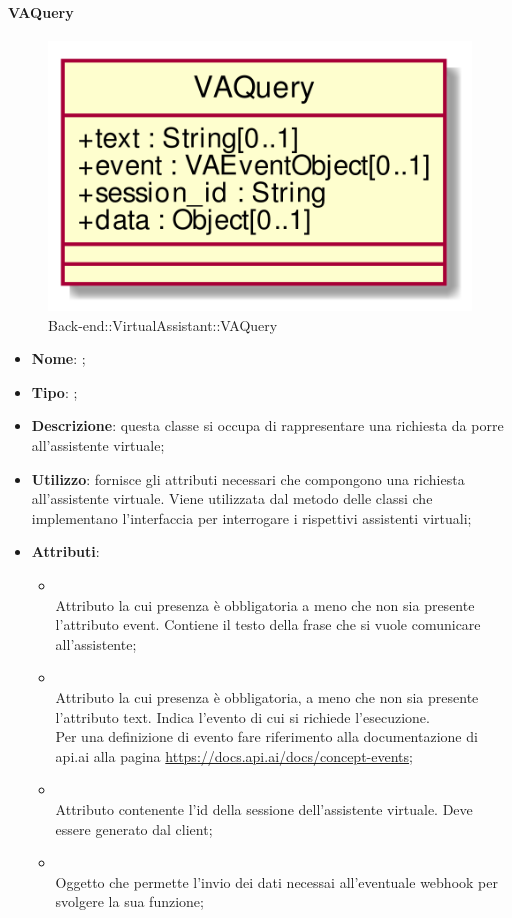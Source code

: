\hypertarget{VAQuery_label}{\paragraph{VAQuery}}
\begin{figure}[h]
	\centering
	\includegraphics[width=\textwidth,height=\textheight,keepaspectratio]{images/ClassVAQuery.png}
	\caption{Back-end::VirtualAssistant::VAQuery}
\end{figure}
\begin{itemize}
	\item \textbf{Nome}: ;
	\item \textbf{Tipo}: ;
	\item \textbf{Descrizione}: questa classe si occupa di rappresentare una richiesta da porre all'assistente virtuale;
	\item \textbf{Utilizzo}: fornisce gli attributi necessari che compongono una richiesta all'assistente virtuale. Viene utilizzata dal metodo  delle classi che implementano l'interfaccia  per interrogare i rispettivi assistenti virtuali;
	\item \textbf{Attributi}:
	\begin{itemize}
		\item[]  \\
		Attributo la cui presenza è obbligatoria a meno che non sia presente l'attributo event. Contiene il testo della frase che si vuole comunicare all'assistente;
		\item[]  \\
		Attributo la cui presenza è obbligatoria, a meno che non sia presente l'attributo text. Indica l'evento di cui si richiede l'esecuzione. \\ Per una definizione di evento fare riferimento alla documentazione di api.ai alla pagina \url{https://docs.api.ai/docs/concept-events};
		\item[]  \\
		Attributo contenente l'id della sessione dell'assistente virtuale. Deve essere generato dal client;
		\item[]  \\
		Oggetto che permette l'invio dei dati necessai all'eventuale webhook per svolgere la sua funzione;
	\end{itemize}
\end{itemize}

